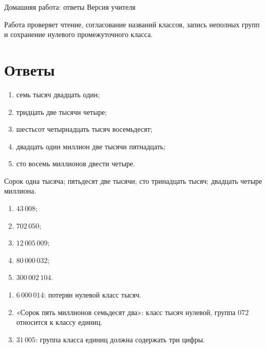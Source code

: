 \worksheettitle
  {Домашняя работа: ответы}
  { Версия учителя}

\begin{teacherbox}[Назначение]
  Работа проверяет чтение, согласование названий классов, запись неполных групп
  и сохранение нулевого промежуточного класса.
\end{teacherbox}

\section{Ответы}

\begin{teacherbox}
  \begin{enumerate}
    \item семь тысяч двадцать один;
    \item тридцать две тысячи четыре;
    \item шестьсот четырнадцать тысяч восемьдесят;
    \item двадцать один миллион две тысячи пятнадцать;
    \item сто восемь миллионов двести четыре.
  \end{enumerate}
\end{teacherbox}

\begin{teacherbox}
  Сорок одна тысяча; пятьдесят две тысячи; сто тринадцать тысяч; двадцать
  четыре миллиона.
\end{teacherbox}

\begin{teacherbox}
  \begin{enumerate}
    \item \(43\,008\);
    \item \(702\,050\);
    \item \(12\,005\,009\);
    \item \(80\,000\,032\);
    \item \(300\,002\,104\).
  \end{enumerate}
\end{teacherbox}

\newpage
\begin{teacherbox}
  \begin{enumerate}
    \item \(6\,000\,014\): потерян нулевой класс тысяч.
    \item «Сорок пять миллионов семьдесят два»: класс тысяч нулевой, группа
      \(072\) относится к классу единиц.
    \item \(31\,005\): группа класса единиц должна содержать три цифры.
  \end{enumerate}
\end{teacherbox}


